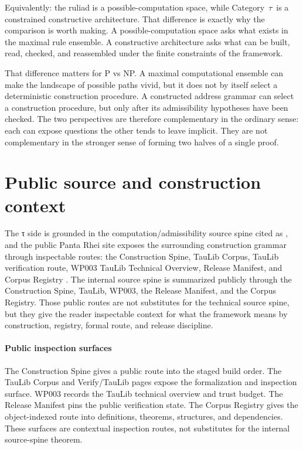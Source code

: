\documentclass{pantarhei-researchnote}
\newcommand{\CategoryTau}{Category~\(\tau\)}
\begin{document}
Equivalently: the ruliad is a possible-computation space, while
\CategoryTau\ is a constrained constructive architecture. That difference
is exactly why the comparison is worth making. A possible-computation
space asks what exists in the maximal rule ensemble. A constructive
architecture asks what can be built, read, checked, and reassembled under
the finite constraints of the framework.

That difference matters for P vs NP. A maximal computational ensemble can
make the landscape of possible paths vivid, but it does not by itself
select a deterministic construction procedure. A constructed address
grammar can select a construction procedure, but only after its
admissibility hypotheses have been checked. The two perspectives are
therefore complementary in the ordinary sense: each can expose questions
the other tends to leave implicit. They are not complementary in the
stronger sense of forming two halves of a single proof.

\section{Public source and construction context}
\label{sec:public-context}

The τ side is grounded in the computation/admissibility source spine
cited as \cite{PR-III}, and the public Panta Rhei site exposes the
surrounding construction grammar through inspectable routes: the
Construction Spine, TauLib Corpus, TauLib verification route, WP003 TauLib
Technical Overview, Release Manifest, and Corpus Registry
\cite{PR-ConstructionSpinePublic,PR-TauLibCorpusPublic,PR-TauLibVerifyPublic,PR-TauLibWhitePaperPublic,PR-ReleaseManifestPublic,PR-RegistryPublic}.
The internal source spine is summarized publicly through the Construction
Spine, TauLib, WP003, the Release Manifest, and the Corpus Registry.
Those public routes are not substitutes for the technical source spine,
but they give the reader inspectable context for what the framework means
by construction, registry, formal route, and release discipline.

\paragraph{Public inspection surfaces}
The Construction Spine gives a public route into the staged build order.
The TauLib Corpus and Verify/TauLib pages expose the formalization and
inspection surface. WP003 records the TauLib technical overview and trust
budget. The Release Manifest pins the public verification state. The
Corpus Registry gives the object-indexed route into definitions,
theorems, structures, and dependencies. These surfaces are contextual
inspection routes, not substitutes for the internal source-spine theorem.
\end{document}
